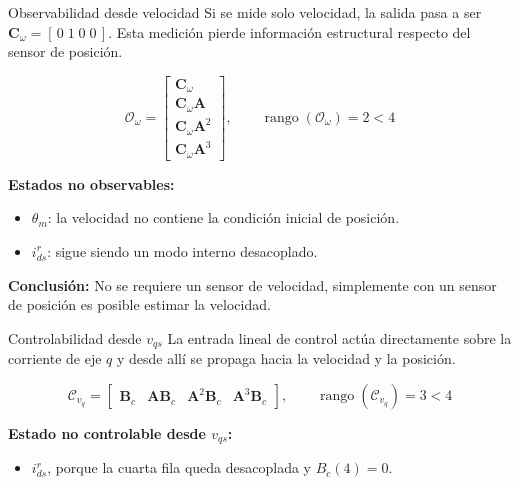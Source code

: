 \documentclass[aspectratio=169,t]{beamer}
\begin{document}
\begin{frame}{Observabilidad desde velocidad}
{\small\color{uncGray}Si se mide solo velocidad, la salida pasa a ser $\bm{C}_\omega=[\,0\;1\;0\;0\,]$. Esta medición pierde información estructural respecto del sensor de posición.}\par
\vspace{3mm}

\begin{equation*}
\mathcal{O}_\omega=
\begin{bmatrix}
\bm{C}_\omega\\
\bm{C}_\omega\bm{A}\\
\bm{C}_\omega\bm{A}^2\\
\bm{C}_\omega\bm{A}^3
\end{bmatrix},
\qquad
\operatorname{rango}(\mathcal{O}_\omega)=2<4
\end{equation*}

\textbf{Estados no observables:}
\begin{itemize}
  \item $\theta_m$: la velocidad no contiene la condición inicial de posición.
  \item $i_{ds}^{r}$: sigue siendo un modo interno desacoplado.
\end{itemize}

\vspace{3mm}
{\small \textbf{Conclusión:} No se requiere un sensor de velocidad, simplemente con un sensor de posición es posible estimar la velocidad.}
\end{frame}

\begin{frame}{Controlabilidad desde $v_{qs}$}
{\small\color{uncGray}La entrada lineal de control actúa directamente sobre la corriente de eje $q$ y desde allí se propaga hacia la velocidad y la posición.}\par
\vspace{3mm}

\begin{equation*}
\mathcal{C}_{v_q}=
\begin{bmatrix}
\bm{B}_c & \bm{A}\bm{B}_c & \bm{A}^2\bm{B}_c & \bm{A}^3\bm{B}_c
\end{bmatrix},
\qquad
\operatorname{rango}(\mathcal{C}_{v_q})=3<4
\end{equation*}

\textbf{Estado no controlable desde $v_{qs}$:}
\begin{itemize}
  \item $i_{ds}^{r}$, porque la cuarta fila queda desacoplada y $B_c(4)=0$.
\end{itemize}
\end{frame}
\end{document}
